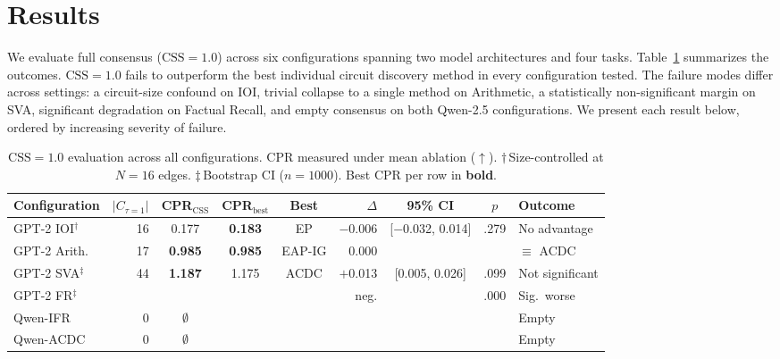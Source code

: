 \section{Results}
\label{sec:results}

We evaluate full consensus ($\text{CSS}=1.0$) across six configurations spanning two model architectures and four tasks.
Table~\ref{tab:main_results} summarizes the outcomes.
$\text{CSS}=1.0$ fails to outperform the best individual circuit discovery method in every configuration tested.
The failure modes differ across settings: a circuit-size confound on IOI, trivial collapse to a single method on Arithmetic, a statistically non-significant margin on SVA, significant degradation on Factual Recall, and empty consensus on both Qwen-2.5 configurations.
We present each result below, ordered by increasing severity of failure.

\begin{table}[t]
\centering
\small
\caption{$\text{CSS}=1.0$ evaluation across all configurations. CPR measured under mean ablation ($\uparrow$). $\dagger$\,Size-controlled at $N\!=\!16$ edges. $\ddagger$\,Bootstrap CI ($n\!=\!1000$). Best CPR per row in \textbf{bold}.}
\label{tab:main_results}
\begin{tabular}{@{}lrcccrccl@{}}
\toprule
Configuration & $|C_{\tau=1}|$ & CPR$_{\text{CSS}}$ & CPR$_{\text{best}}$ & Best & $\Delta$ & 95\% CI & $p$ & Outcome \\
\midrule
GPT-2 IOI$^\dagger$ & 16 & 0.177 & \textbf{0.183} & EP & $-$0.006 & [$-$0.032, 0.014] & .279 & No advantage \\
GPT-2 Arith. & 17 & \textbf{0.985} & \textbf{0.985} & EAP-IG & 0.000 & & & $\equiv$ ACDC \\
GPT-2 SVA$^\ddagger$ & 44 & \textbf{1.187} & 1.175 & ACDC & $+$0.013 & [0.005, 0.026] & .099 & Not significant \\
GPT-2 FR$^\ddagger$ & & & & & neg. & & .000 & Sig.\ worse \\
Qwen-IFR & 0 & $\emptyset$ & & & & & & Empty \\
Qwen-ACDC & 0 & $\emptyset$ & & & & & & Empty \\
\bottomrule
\end{tabular}
\end{table}

